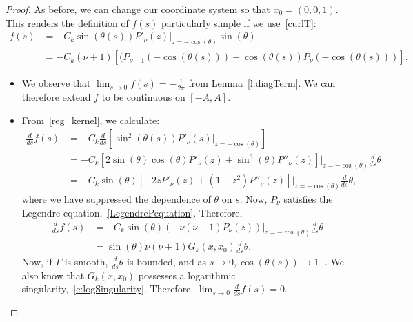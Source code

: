 \documentclass[final]{siamltex}
\begin{document}
\begin{proof}
As before, we can change our coordinate system so that
$x_{0}=(0,0,1)$.  This renders the definition of $f(s)$ particularly
simple if we use~\eqref{curlT}:
\begin{align} 
  \label{reg_kernel}
  f(s) &= -C_{k} \sin(\theta(s)) P'_{\nu}(z)
    \vert_{z=-\cos(\theta)} \sin(\theta) \\
  &=-C_{k} (\nu+1) \left[(P_{\nu+1}(-\cos(\theta(s))) + 
    \cos(\theta(s))P_{\nu}(-\cos(\theta(s)))\right]. \nonumber
\end{align}
\begin{itemize}
  \item  We  observe that $\lim_{s\rightarrow 0} f(s) =
  -\frac{1}{2\pi}$ from Lemma~\ref{l:diagTerm}. We can therefore extend
  $f$ to be continuous on $[-A,A]$.  

  \item From~\eqref{reg_kernel}, we calculate:
  \begin{align*}
    \frac{d}{ds}f(s) &=-C_{k} \frac{d}{ds}\left[ \sin^2(\theta(s)) 
      P'_\nu(s)\vert_{z=-\cos(\theta)}\right] \\ 
    &= -C_{k}\left[ 2 \sin(\theta) \cos(\theta) 
      P'_{\nu}(z)+ \sin^{3}(\theta)
      P''_{\nu}(z)\right]\vert_{z=-\cos(\theta)} \frac{d}{ds}\theta \\
    &=-C_{k}\sin(\theta) \left[ -2 z P'_\nu(z) + 
      (1-z^2) P''_\nu(z)\right]\vert_{z=-\cos(\theta)} 
      \frac{d}{ds}\theta,
  \end{align*} 
  where we have suppressed the dependence of $\theta$ on $s$. Now,
  $P_\nu$ satisfies the Legendre equation,~\eqref{LegendrePequation}.
  Therefore, 
  \begin{align*}
    \frac{d}{ds}f(s) &= - C_{k}\sin(\theta) (-\nu(\nu+1) 
      P_\nu(z))\vert_{z=-\cos(\theta)} \frac{d}{ds}\theta \\
    &= \sin(\theta)\nu(\nu+1) G_k(x,x_0) \frac{d}{ds}\theta. 
  \end{align*}
  Now, if $\Gamma$ is smooth, $\frac{d}{ds}\theta$ is bounded, and as
  $s\rightarrow 0, \cos(\theta(s)) \rightarrow 1^-$.  We also know that
  $G_k(x,x_0)$ possesses a logarithmic
  singularity,~\eqref{e:logSingularity}. Therefore,
  $\lim_{s\rightarrow 0} \frac{d}{ds}f(s) =0$.


\end{itemize}
\end{proof}
\end{document}
